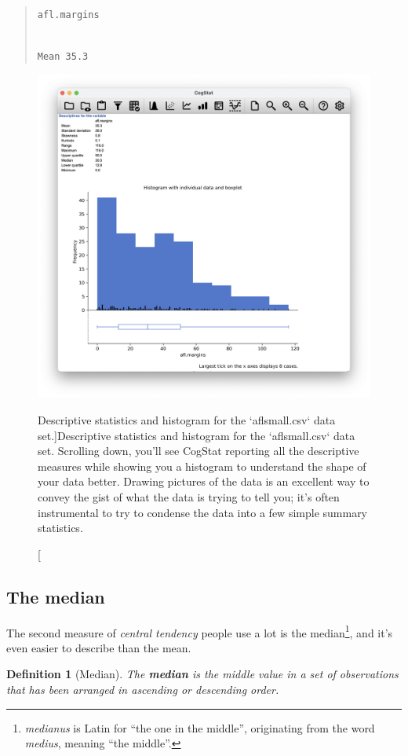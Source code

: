 \documentclass[
  11pt,
]{book}
\theoremstyle{indenteddefinition}
\newtheorem{definition}{Definition}[chapter]
\theoremstyle{indenteddefinition}
\theoremstyle{definition}
\theoremstyle{definition}
\theoremstyle{remark}
\begin{document}
\begin{quote}
\texttt{afl.margins}\strut \\
\texttt{Mean\ 35.3}
\end{quote}

\begin{figure}

{\centering \includegraphics[width=0.66\linewidth]{resources/image/cogstathistogramaflsmall} 

}

\caption[Descriptive statistics and histogram for the `aflsmall.csv` data set.]{Descriptive statistics and histogram for the `aflsmall.csv` data set. Scrolling down, you'll see CogStat reporting all the descriptive measures while showing you a histogram to understand the shape of your data better. Drawing pictures of the data is an excellent way to convey the gist of what the data is trying to tell you; it's often instrumental to try to condense the data into a few simple summary statistics.}\label{fig:histogramaflsmall}
\end{figure}

\hypertarget{median}{%
\subsection{The median}\label{median}}

The second measure of \emph{central tendency} people use a lot is the median\footnote{\emph{medianus} is Latin for ``the one in the middle'', originating from the word \emph{medius}, meaning ``the middle''.}, and it's even easier to describe than the mean.

\begin{definition}[Median]
\protect\hypertarget{def:defmedian}{}\label{def:defmedian}The \textbf{median} is the middle value in a set of observations that has been arranged in ascending or descending order.
\end{definition}
\end{document}
